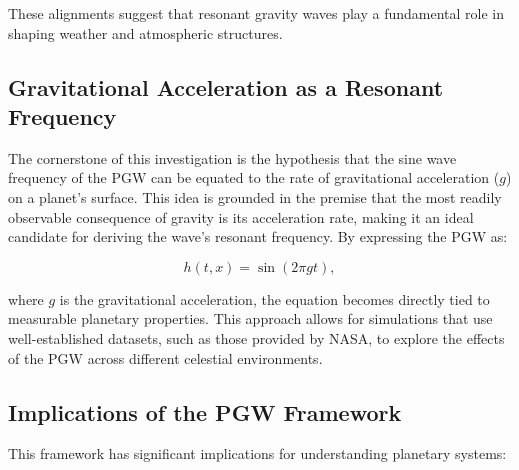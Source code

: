 \documentclass[12pt]{article}
\begin{document}
These alignments suggest that resonant gravity waves play a fundamental role in shaping weather and atmospheric structures.

\subsection*{Gravitational Acceleration as a Resonant Frequency}

The cornerstone of this investigation is the hypothesis that the sine wave frequency of the PGW can be equated to the rate of gravitational acceleration (\(g\)) on a planet’s surface. This idea is grounded in the premise that the most readily observable consequence of gravity is its acceleration rate, making it an ideal candidate for deriving the wave’s resonant frequency. By expressing the PGW as:

\[
h(t, x) = \sin(2 \pi g t),
\]

where \(g\) is the gravitational acceleration, the equation becomes directly tied to measurable planetary properties. This approach allows for simulations that use well-established datasets, such as those provided by NASA, to explore the effects of the PGW across different celestial environments.

\subsection*{Implications of the PGW Framework}

This framework has significant implications for understanding planetary systems:
\end{document}
